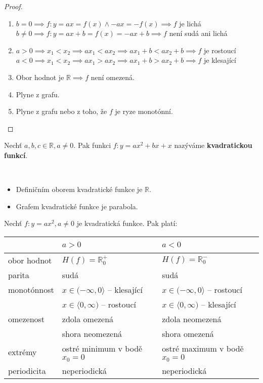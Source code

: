 \begin{proof}\,
  \begin{enumerate}[$i.$]
    \item $b=0 \implies f:y= ax = f(x) \land -ax = -f(x) \implies f$ je lichá\\
          $b\neq 0 \implies f:y = ax + b = f(x) = -ax + b \implies f$ není sudá ani lichá
    \item $a>0 \implies x_1 < x_2 \implies ax_1 < ax_2 \implies ax_1 + b < ax_2 + b \implies f$ je rostoucí\\
          $a<0 \implies x_1 < x_2 \implies ax_1 > ax_2 \implies ax_1 + b > ax_2 + b \implies f$ je klesající
    \item Obor hodnot je $\mathbb R \implies f$ není omezená.
    \item Plyne z grafu.
    \item Plyne z grafu nebo z toho, že $f$ je ryze monotónní. \qedhere
  \end{enumerate}
\end{proof}

\begin{definition}
  Nechť $a,b,c \in \mathbb R, a \neq 0$. Pak funkci $f:y = ax^2 + bx+ x$ nazýváme \textbf{kvadratickou funkcí}.
\end{definition}

\begin{pozn}\,
  \begin{itemize}
    \item Definičním oborem kvadratické funkce je $\mathbb R$.
    \item Grafem kvadratické funkce je parabola.
  \end{itemize}
\end{pozn}

\begin{veta}
  Nechť $f:y = ax^2, a \neq 0$ je kvadratická funkce. Pak platí:\\
  \begin{center}
    \begin{tabularx}{\textwidth}{ l | l  l }
        \, & $a>0$ & $a<0$ \\
        \hline
        obor hodnot & $H(f) = \mathbb R^{+}_0$ & $H(f) = \mathbb R^{-}_0$ \\
        parita & sudá & sudá \\
        monotónnost & $x \in (-\infty, 0\rangle$ -- klesající & $x \in (-\infty, 0\rangle$ -- rostoucí \\
        \, & $x \in \langle 0, \infty)$ -- rostoucí & $x \in \langle 0, \infty)$ -- klesající \\
        omezenost & zdola omezená & zdola neomezená \\
        \, & shora neomezená & shora omezená \\
        extrémy &  ostré minimum v bodě $x_0=0$ & ostré maximum v bodě $x_0=0$ \\
        periodicita & neperiodická & neperiodická
    \end{tabularx}
  \end{center}
\end{veta}

